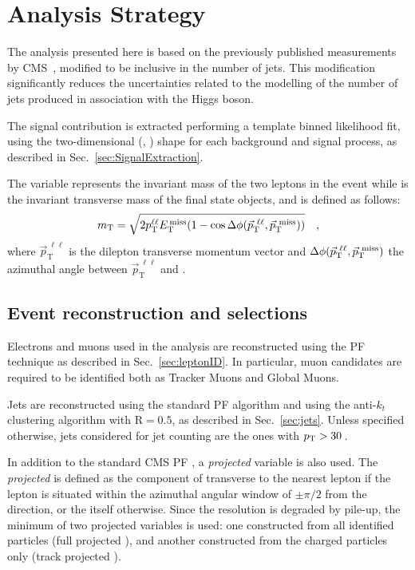 \section{Analysis Strategy}
\label{sec:AnalysisStrategy}

The analysis presented here is based on the previously published \hwwllnn measurements by CMS~\cite{Chatrchyan:2013iaa}, modified to be inclusive in the number of jets. 
This modification significantly reduces the uncertainties related to the modelling of the number of jets produced in association with the Higgs boson.

The signal contribution is extracted performing a template binned likelihood fit, using the two-dimensional (\mll, \mt) shape for each background and signal process, as described in Sec.~\ref{sec:SignalExtraction}.

The \mll variable represents the invariant mass of the two leptons in the event while \mt is the invariant transverse mass of the final state objects, and is defined as follows:
\begin{equation}
m_\mathrm{T} = \sqrt{2p_\mathrm{T}^{\ell\ell}E_\mathrm{T}^\mathrm{\,miss}(1-\cos\Delta\phi(\vec{p}_\mathrm{T}^{~\ell\ell},\vec{p}_\mathrm{T}^\mathrm{~miss}))} \quad ,
\end{equation}
\noindent where $\vec{p}_\mathrm{T}^{~\ell\ell}$ is the dilepton transverse momentum vector and $\Delta\phi(\vec{p}_\mathrm{T}^{~\ell\ell},\vec{p}_\mathrm{T}^\mathrm{~miss})$ the azimuthal angle between $\vec{p}_\mathrm{T}^{~\ell\ell}$ and \ptmiss.

\subsection{Event reconstruction and selections}\label{sec:Selections}

Electrons and muons used in the analysis are reconstructed using the PF technique as described in Sec.~\ref{sec:leptonID}. In particular, muon candidates are required to be identified both as Tracker Muons and Global Muons.

Jets are reconstructed using the standard PF algorithm and using the anti-$k_t$ clustering algorithm with $\mathrm{R} = 0.5$, as described in Sec.~\ref{sec:jets}. Unless specified otherwise, jets considered for jet counting are the ones with $p_\mathrm{T} > 30$\,\GeV.

In addition to the standard CMS PF \MET, a \textit{projected} \MET variable is also used. The \textit{projected} \MET is defined as the component of \ptmiss transverse to the nearest lepton if the lepton is situated within the azimuthal angular window of $\pm \pi/2$ from the \ptmiss direction, or the \MET itself otherwise.
Since the \MET resolution is degraded by pile-up, the minimum of two projected \MET variables is used: one constructed from all identified particles (full projected \MET), and another constructed from the charged particles only (track projected \MET).

